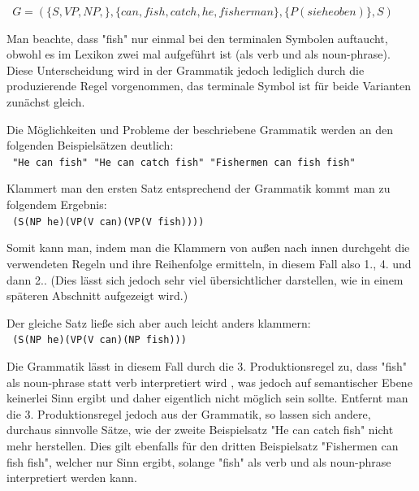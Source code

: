 \documentclass[12pt]{report}
\begin{document}
\begin{center}
\tt
$G=(\lbrace S,VP,NP,\rbrace ,\lbrace can, fish, catch, he, fisherman\rbrace ,\lbrace P(siehe oben)\rbrace ,S)$
\rm
\end{center}

Man beachte, dass "fish" nur einmal bei den terminalen Symbolen auftaucht, obwohl es im Lexikon zwei mal aufgeführt ist (als verb und als noun-phrase). Diese Unterscheidung wird in der Grammatik jedoch lediglich durch die produzierende Regel vorgenommen, das terminale Symbol ist für beide Varianten zunächst gleich.

Die Möglichkeiten und Probleme der beschriebene Grammatik werden an den folgenden Beispielsätzen deutlich:
\\

\tt
"He can fish"
"He can catch fish"
"Fishermen can fish fish"
\rm

Klammert man den ersten Satz entsprechend der Grammatik kommt man zu folgendem Ergebnis:\\

\tt 
(S(NP he)(VP(V can)(VP(V fish))))\\
\rm

Somit kann man, indem man die Klammern von außen nach innen durchgeht die verwendeten Regeln und ihre Reihenfolge ermitteln, in diesem Fall also 1., 4. und dann 2.. (Dies lässt sich jedoch sehr viel übersichtlicher darstellen, wie in einem späteren Abschnitt aufgezeigt wird.)

Der gleiche Satz ließe sich aber auch leicht anders klammern:\\

\tt
(S(NP he)(VP(V can)(NP fish)))\\
\rm

Die Grammatik lässt in diesem Fall durch die 3. Produktionsregel zu, dass "fish" als noun-phrase statt verb interpretiert wird , was jedoch auf semantischer Ebene keinerlei Sinn ergibt und daher eigentlich nicht möglich sein sollte. Entfernt man die 3. Produktionsregel jedoch aus der Grammatik, so lassen sich andere, durchaus sinnvolle Sätze, wie der zweite Beispielsatz "He can catch fish" nicht mehr herstellen. Dies gilt ebenfalls für den dritten Beispielsatz "Fishermen can fish fish", welcher nur Sinn ergibt, solange "fish" als verb und als noun-phrase interpretiert werden kann.
\end{document}
